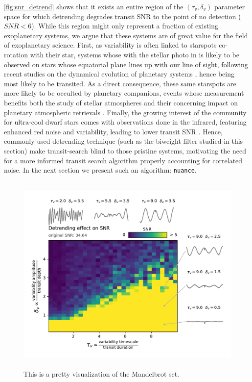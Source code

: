 \documentclass{aastex631}
\begin{document}
\autoref{fig:snr_detrend} shows that it exists an entire region of the $(\tau_v, \delta_v)$ parameter space for which detrending degrades transit SNR to the point of no detection ($SNR < 6$). While this region might only represent a fraction of existing exoplanetary systems, we argue that these systems are of great value for the field of exoplanetary science. First, as variability is often linked to starspots co-rotation with their star, systems whose  with the stellar photo in is likely to be observed on stars whose equatorial plane lines up with our line of sight, following recent studies on the dynamical evolution of planetary systems \cite{}, hence being most likely to be transited. As a direct consequence, these same starspots are more likely to be occulted by planetary companions, events whose measurement benefits both the study of stellar atmospheres and their concerning impact on planetary atmospheric retrievals \cite{}. Finally, the growing interest of the community for ultra-cool dwarf stars comes with observations done in the infrared, featuring enhanced red noise and variability, leading to lower transit SNR \cite{}. Hence, commonly-used detrending technique (such as the biweight filter studied in this section) make transit-search blind to those pristine systems, motivating the need for a more informed transit search algorithm properly accounting for correlated noise. In the next section we present such an algorithm: \texttt{nuance}.

\begin{figure}[H]
    \begin{centering}
        \includegraphics[height=10cm]{../../workflows/cleaning_snr/figures/simu1/result.pdf}
        \caption{This is a pretty visualization of the Mandelbrot set.}
        \label{fig:snr_detrend}
    \end{centering}
\end{figure}
\end{document}
